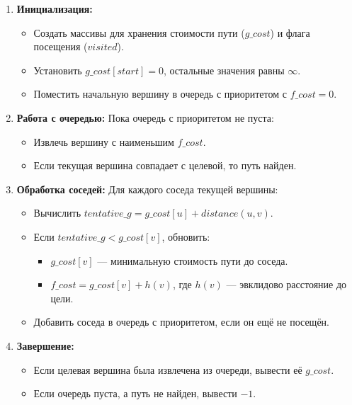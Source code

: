 \documentclass[12pt,a4paper]{article}
\begin{document}
\begin{enumerate}
    \item \textbf{Инициализация:}
    \begin{itemize}
        \item Создать массивы для хранения стоимости пути ($g\_cost$) и флага посещения ($visited$).
        \item Установить $g\_cost[start] = 0$, остальные значения равны $\infty$.
        \item Поместить начальную вершину в очередь с приоритетом с $f\_cost = 0$.
    \end{itemize}
    
    \item \textbf{Работа с очередью:}
    Пока очередь с приоритетом не пуста:
    \begin{itemize}
        \item Извлечь вершину с наименьшим $f\_cost$.
        \item Если текущая вершина совпадает с целевой, то путь найден.
    \end{itemize}

    \item \textbf{Обработка соседей:}
    Для каждого соседа текущей вершины:
    \begin{itemize}
        \item Вычислить $tentative\_g = g\_cost[u] + distance(u, v)$.
        \item Если $tentative\_g < g\_cost[v]$, обновить:
        \begin{itemize}
            \item $g\_cost[v]$ — минимальную стоимость пути до соседа.
            \item $f\_cost = g\_cost[v] + h(v)$, где $h(v)$ — эвклидово расстояние до цели.
        \end{itemize}
        \item Добавить соседа в очередь с приоритетом, если он ещё не посещён.
    \end{itemize}

    \item \textbf{Завершение:}
    \begin{itemize}
        \item Если целевая вершина была извлечена из очереди, вывести её $g\_cost$.
        \item Если очередь пуста, а путь не найден, вывести $-1$.
    \end{itemize}
\end{enumerate}
\end{document}
